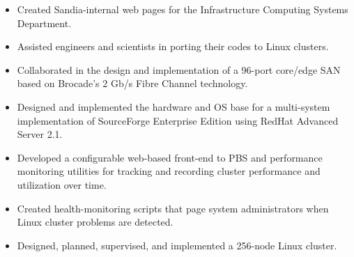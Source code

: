 \documentclass[letterpaper,10pt]{article}
\newcommand{\resitem}[1]{\item #1 \vspace{-2pt}}
\begin{document}
\begin{itemize}
\begin{itemize}
        \resitem{Created Sandia-internal web pages for the Infrastructure Computing Systems Department.}
        \resitem{Assisted engineers and scientists in porting their codes to Linux clusters.}
        \resitem{Collaborated in the design and implementation of a 96-port core/edge SAN based on Brocade's 2 Gb/s Fibre Channel technology.}
        \resitem{Designed and implemented the hardware and OS base for a multi-system implementation of SourceForge Enterprise Edition using RedHat Advanced Server 2.1.}
        \resitem{Developed a configurable web-based front-end to PBS and performance monitoring utilities for tracking and recording cluster performance and utilization over time.}
        \resitem{Created health-monitoring scripts that page system administrators when Linux cluster problems are detected.}
        \resitem{Designed, planned, supervised, and implemented a 256-node Linux cluster.}
    \end{itemize}


\end{itemize}
\end{document}
